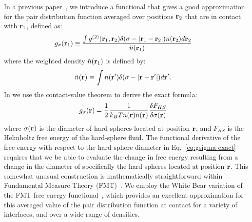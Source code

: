 In a previous paper~\cite{schulte2012using}, we introduce a
functional that gives a good approximation for the pair distribution
function averaged over positions $\textbf{r}_2$ that are in contact with
$\textbf{r}_1$, defined as:
\begin{align}
  g_\sigma(\textbf{r}_1) &\equiv \frac{ \int g^{(2)}(\textbf{r}_1,\textbf{r}_2) \delta(\sigma -|\textbf{r}_1-\textbf{r}_2|)n(\textbf{r}_2)
    d\textbf{r}_2 }{ \tilde{n}(\textbf{r}_1)  }
\end{align}
where the weighted density $\tilde{n}(\textbf{r}_1)$ is defined by:
\begin{align}
  \tilde{n}(\textbf{r}) &\equiv \int n(\textbf{r}') \delta(\sigma -|\textbf{r} - \textbf{r}'|)d\textbf{r}'.
\end{align}
In \cite{schulte2012using} we use the contact-value theorem to derive the exact formula:
\begin{align}
  g_\sigma(\rr)%
  &= \frac12 \frac{1}{k_BT n(\rr) \tilde{n}(\rr)} \frac{\delta
    F_{HS}}{\delta \sigma(\mathbf{r})} \label{eq:gsigma-exact}
\end{align}
where $\sigma(\textbf{r})$ is the diameter of hard spheres located at
position $\textbf{r}$, and $F_{HS}$ is the Helmholtz free energy of the
hard-sphere fluid.  The functional derivative of the free energy with
respect to the hard-sphere diameter in Eq.~\ref{eq:gsigma-exact} requires
that we be able to evaluate the change in free energy resulting from a
change in the diameter of specifically the hard spheres located at
position $\textbf{r}$.  This somewhat unusual construction is mathematically
straightforward within Fundamental Measure Theory
(FMT)~\cite{rosenfeld1989free}.  We employ the White Bear variation of
the FMT free energy functional~\cite{roth2002whitebear}, which
provides an excellent approximation for this averaged value of the
pair distribution function at contact for a variety of interfaces, and
over a wide range of densities.




